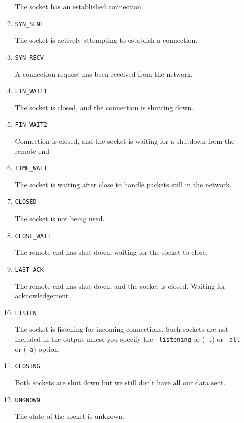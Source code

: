 \documentclass[a4paper,12pt]{article}
\begin{document}
\begin{enumerate}
\begin{enumerate}
\begin{par}
		The socket has an established connection.
		\end{par}
		\item \texttt{SYN\_SENT}
		\begin{par}
			The socket is actively attempting to establish a connection.
			\end{par}
		\item \texttt{SYN\_RECV}
		\begin{par}
			A connection request has been received from the network.
			\end{par}
		\item \texttt{FIN\_WAIT1}
		\begin{par}
			The socket is closed, and the connection is shutting down.
			\end{par}
		\item \texttt{FIN\_WAIT2}
		\begin{par}
			Connection is closed, and the socket is waiting for a shutdown from the remote end
			\end{par}
		\item \texttt{TIME\_WAIT}
		\begin{par}
			The socket is waiting after close to handle packets still in the network.
			\end{par}
			\item \texttt{CLOSED}
			\begin{par}
				The socket is not being used.
				\end{par}
			\item \texttt{CLOSE\_WAIT}
			\begin{par}
				The remote end has shut down, waiting for the socket to close.
				\end{par}
			\item {\texttt{LAST\_ACK}}
			\begin{par}
				The remote end has shut down, and the socket is closed. Waiting for acknowledgement.
				\end{par}
			\item \texttt{LISTEN}
			\begin{par}
				The socket is listening for incoming connections. Such sockets are not included in the output unless you specify the \texttt{--listening} or (\texttt{-l}) or \texttt{--all} or (\texttt{-a}) option.
				\end{par}
			\item \texttt{CLOSING}
			\begin{par}
				Both sockets are shut down but we still don't have all our data sent.
				\end{par}
			\item \texttt{UNKNOWN}
			\begin{par}
				The state of the socket is unknown.
				\end{par}
\end{enumerate}\end{enumerate}
	\newpage
\end{document}
